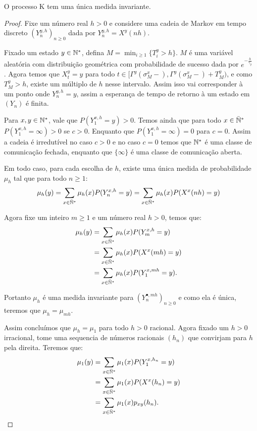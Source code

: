\begin{proposicao}
  O processo K tem uma única medida invariante.
\end{proposicao}
\begin{proof}
  Fixe um número real $h > 0$ e considere uma cadeia de Markov em
  tempo discreto $(Y^{y, h}_n)_{n \geq 0}$ dada por $Y^{y, h}_n =
  X^y(n h)$.

  Fixado um estado $y \in {\mathbb{N^*}}$, defina $M = \min_{i \geq 1} \{ T_i^y >
  h \}$. $M$ é uma variável aleatória com distribuição geométrica com
  probabilidade de sucesso dada por $e^{-\frac{h}{\gamma_y}}$. Agora
  temos que $X_t^y = y$ para todo $t \in [\Gamma^y(\sigma_M^x-),
  \Gamma^y(\sigma_M^x-) + T_M^y)$, e como $T_M^y > h$, existe um
  múltiplo de $h$ nesse intervalo. Assim isso vai corresponder à um
  ponto onde $Y_n^{y, h} = y$, assim a esperança de tempo de retorno à
  um estado em $(Y_n)$ é finita.


  Para $x, y \in {\mathbb{N^*}}$, vale que $P (Y^{x, h}_1 = y) > 0$. Temos ainda
  que para todo $x \in {\mathbb{\bar{N}^*}}$ $P (Y^{x, h}_1 = \infty ) > 0$ se $c >
  0$. Enquanto que $P (Y^{x, h}_1 = \infty) = 0$ para $c = 0$. Assim
  a cadeia é irredutível no caso $c > 0$ e no caso $c = 0$ temos que
  ${\mathbb{N^*}}$ é uma classe de comunicação fechada, enquanto que $\{\infty\}$
  é uma classe de comunicação aberta.


  Em todo caso, para cada escolha de $h$, existe uma única medida de
  probabilidade $\mu_h$ tal que para todo $n \geq 1$:
  \begin{displaymath}
    \mu_h (y) = \sum_{x \in {\mathbb{\bar{N}^*}}} \mu_h(x) P ( Y_n^ {x, h} = y) =
    \sum_{x \in {\mathbb{\bar{N}^*}}} \mu_h(x) P ( X^x (nh) = y)
  \end{displaymath}

  Agora fixe um inteiro $m \geq 1$ e um número real $h > 0$, temos que:
  \begin{align*}
    \mu_h (y) &= \sum_{x \in {\mathbb{\bar{N}^*}}} \mu_h(x) P ( Y_{m}^ {x, h} = y)\\
    &= \sum_{x \in {\mathbb{\bar{N}^*}}} \mu_h(x) P ( X^x (m h) = y) \\
    &= \sum_{x \in {\mathbb{\bar{N}^*}}} \mu_h(x) P ( Y_{1}^ {x, m h} = y).
  \end{align*}

  Portanto $\mu_h$ é uma medida invariante para $(Y^{\bullet, mh}_n)_{n
    \geq 0}$ e como ela é única, teremos que $\mu_h = \mu_{m h}$.

  Assim concluímos que $\mu_{h} = \mu_1$ para todo $h > 0$ racional.
  Agora fixado um $h > 0$ irracional, tome uma sequencia de números
  racionais $(h_n)$ que convirjam para $h$ pela direita. Teremos que:
  \begin{align*}
    \mu_1(y) &= \sum_{x \in {\mathbb{\bar{N}^*}}} \mu_1(x) P ( Y_{1}^ {x, h_n} = y)\\
    &= \sum_{x \in {\mathbb{\bar{N}^*}}} \mu_1(x) P ( X^x(h_n) = y)\\
    &= \sum_{x \in {\mathbb{\bar{N}^*}}} \mu_1(x) p_{x y} (h_n).    
  \end{align*}
  

\end{proof}
